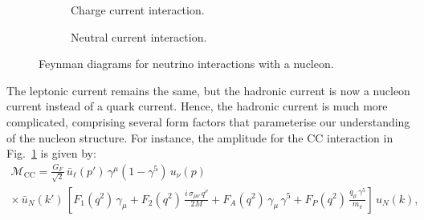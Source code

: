 \begin{figure}[h]
  \centering
  \begin{subfigure}[b]{0.45\textwidth}
    \centering
    \caption{Charge current interaction.}
    \label{fig:cc-interaction-n}
  \end{subfigure}
  \hfill
  \begin{subfigure}[b]{0.45\textwidth}
    \centering
    \caption{Neutral current interaction.}
    \label{fig:nc-interaction-n}
  \end{subfigure}
  \caption{Feynman diagrams for neutrino interactions with a nucleon.}
  \label{fig:nu-n-feyn}
\end{figure}
The leptonic current remains the same, but the hadronic current is now a nucleon current instead of a quark current.
Hence, the hadronic current is much more complicated, comprising several form factors that parameterise our understanding of the nucleon structure.
For instance, the amplitude for the CC interaction in Fig.~\ref{fig:cc-interaction-n} is given by:
\begin{align}
  \mathcal{M}_{\text{CC}} = \frac{G_F}{\sqrt{2}} \,\bar{u}_\ell(p')\,\gamma^\mu (1 - \gamma^5)\,u_\nu(p) \\
  \times \,\bar{u}_N(k')\,\left[ F_1(q^2)\,\gamma_\mu + F_2(q^2)\,\frac{i\,\sigma_{\mu\nu}\,q^\nu}{2M} + F_A(q^2)\,\gamma_\mu\,\gamma^5 + F_P(q^2)\,\frac{q_\mu\,\gamma^5}{m_\pi} \right]\,u_N(k),
\end{align}
